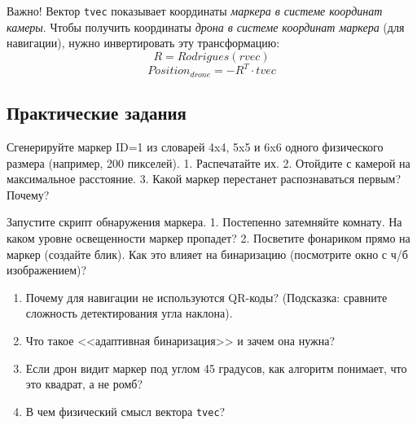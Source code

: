 \begin{alertbox}{Важно!}
Вектор \texttt{tvec} показывает координаты \textit{маркера в системе координат камеры}. Чтобы получить координаты \textit{дрона в системе координат маркера} (для навигации), нужно инвертировать эту трансформацию:
$$ R = Rodrigues(rvec) $$
$$ Position_{drone} = -R^T \cdot tvec $$
\end{alertbox}

\subsection{Практические задания}

\begin{taskbox}
Сгенерируйте маркер ID=1 из словарей 4x4, 5x5 и 6x6 одного физического размера (например, 200 пикселей).
1. Распечатайте их.
2. Отойдите с камерой на максимальное расстояние.
3. Какой маркер перестанет распознаваться первым? Почему?
\end{taskbox}

\begin{taskbox}
Запустите скрипт обнаружения маркера.
1. Постепенно затемняйте комнату. На каком уровне освещенности маркер пропадет?
2. Посветите фонариком прямо на маркер (создайте блик). Как это влияет на бинаризацию (посмотрите окно с ч/б изображением)?
\end{taskbox}

\begin{questionbox}
\begin{enumerate}
    \item Почему для навигации не используются QR-коды? (Подсказка: сравните сложность детектирования угла наклона).
    \item Что такое <<адаптивная бинаризация>> и зачем она нужна?
    \item Если дрон видит маркер под углом 45 градусов, как алгоритм понимает, что это квадрат, а не ромб?
    \item В чем физический смысл вектора \texttt{tvec}?
\end{enumerate}
\end{questionbox}
